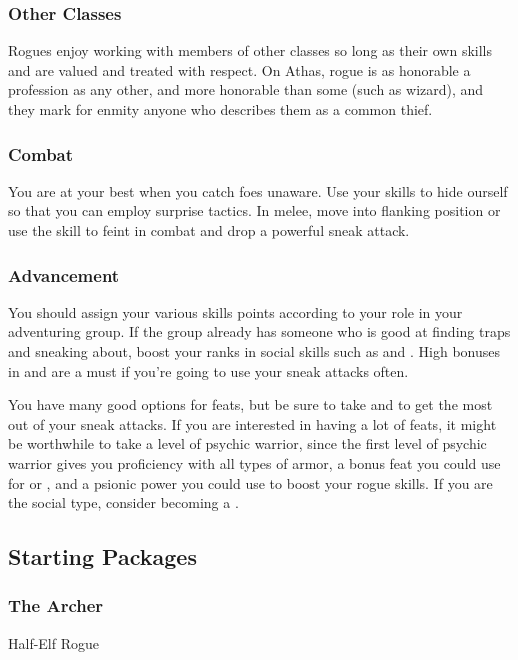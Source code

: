 \subsubsection{Other Classes}

Rogues enjoy working with members of other classes so long as their own skills and are valued and treated with respect. On Athas, rogue is as honorable a profession as any other, and more honorable than some (such as wizard), and they mark for enmity anyone who describes them as a common thief.

\subsubsection{Combat}
You are at your best when you catch foes unaware. Use your skills to hide ourself so that you can employ surprise tactics. In melee, move into flanking position or use the  skill to feint in combat and drop a powerful sneak attack.

\subsubsection{Advancement}
You should assign your various skills points according to your role in your adventuring group. If the group already has someone who is good at finding traps and sneaking about, boost your ranks in social skills such as  and . High bonuses in  and  are a must if you're going to use your sneak attacks often.

You have many good options for feats, but be sure to take  and  to get the most out of your sneak attacks. If you are interested in having a lot of feats, it might be worthwhile to take a level of psychic warrior, since the first level of psychic warrior gives you proficiency with all types of armor, a bonus feat you could use for  or , and a psionic power you could use to boost your rogue skills. If you are the social type, consider becoming a .

\subsection{Starting Packages}
\subsubsection{The Archer}
Half-Elf Rogue

